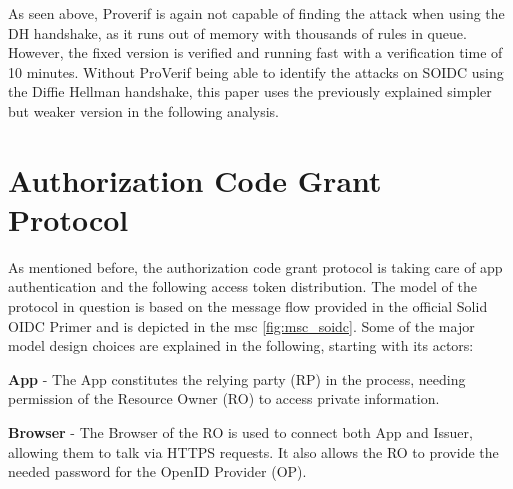 \documentclass[11pt,twoside,a4paper,openright]{book}
\begin{document}
    \begin{table}[H]
        \centering
        \def\arraystretch{1.5}
    \end{table}

As seen above, Proverif is again not capable of finding the attack when using the DH handshake, as it runs out of memory with thousands of rules in queue. However, the fixed version is verified and running fast with a verification time of 10 minutes. Without ProVerif being able to identify the attacks on SOIDC using the Diffie Hellman handshake, this paper uses the previously explained simpler but weaker version in the following analysis.


\section{Authorization Code Grant Protocol}

As mentioned before, the authorization code grant protocol is taking care of app authentication and the following access token distribution. The model of the protocol in question is based on the message flow provided in the official Solid OIDC Primer \cite{solidPrimer} and is depicted in the msc \ref{fig:msc_soidc}. Some of the major model design choices are explained in the following, starting with its actors:

\textbf{App} - The App constitutes the relying party (RP) in the process, needing permission of the Resource Owner (RO) to access private information. 

\textbf{Browser} - The Browser of the RO is used to connect both App and Issuer, allowing them to talk via HTTPS requests. It also allows the RO to provide the needed password for the OpenID Provider (OP).
\end{document}
